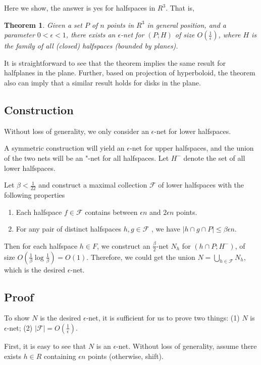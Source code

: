\documentclass[11pt]{article}
\newtheorem{theorem}[lemma]{Theorem}
\begin{document}
Here we show, the answer is yes for halfspaces in $R^3$. That is, 
\begin{theorem}\cite{har2014epsilon}
	Given a set $P$ of $n$ points in $R^3$ in general position, and a parameter $0 <  \epsilon<1$, there
	exists an $\epsilon$-net for $(P;H)$ of size $O(\frac{1}{\epsilon})$, where $H$ is the family of all (closed) halfspaces
	(bounded by planes).
\end{theorem} 
It is straightforward to see that the theorem implies the same result for halfplanes in the plane. 
Further, based on projection of hyperboloid, the theorem also can imply that a similar result holds for disks in the plane. 


\subsection{Construction}
Without loss of generality, we only consider an $\epsilon$-net for lower halfspaces.

A symmetric construction will yield an $\epsilon$-net for upper halfspaces, and the union of the two nets will be
an "-net for all halfspaces. Let $H^-$ denote the set of all lower halfspaces.

\newcommand{\F}{\mathcal{F}}
Let $\beta<\frac {1} {22}$ and construct  a maximal collection $\F$ of lower halfspaces with the following properties 
\begin{enumerate}
	\item Each halfspace  $f\in \F$ contains between $\epsilon n$ and $2\epsilon n$ points.
	\item For any pair of distinct halfspaces $h,g\in \F$ , we have $ |h\cap g\cap P |\leq \beta \epsilon n$.
\end{enumerate}



Then for each halfspace $h \in F$, we construct an $\frac{\beta}{2}$-net $N_h$ for  $(h \cap P;H^-)$, of size
	$O(\frac{1}{\beta}\log \frac{1}{\beta})=O(1)$.
Therefore, we could get the union $N=\bigcup_{h\in\F} N_h$, which is the desired $\epsilon$-net.

\subsection{Proof}
To show $N$ is the desired $\epsilon$-net, 
	it is sufficient for us to prove two things: (1) $N$ is $\epsilon$-net; (2) $|\F|=O(\frac{1}{\epsilon})$. 

First, it is easy to see that $N$ is an $\epsilon$-net.
Without loss of generality, assume there exists $h\in R$ containing $\epsilon n$ points (otherwise, shift). 
\end{document}
